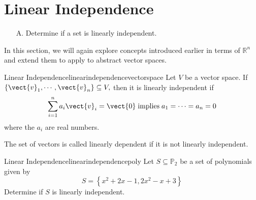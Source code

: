 \section{Linear Independence}

\begin{outcome}
\begin{enumerate}
\item[A.] Determine if a set is linearly independent.
\end{enumerate}
\end{outcome}

In this section, we will again explore concepts introduced earlier in terms of $\mathbb{R}^n$ and extend them to apply to abstract vector spaces. 

\begin{definition}{Linear Independence}{linearindependencevectorspace}
Let $V$ be a vector space. If $\{\vect{v}_{1},\cdots ,\vect{v}_{n}\} \subseteq V,$ then it is linearly independent
 if
\begin{equation*}
\sum_{i=1}^{n}a_{i}\vect{v}_{i}=\vect{0} \;\mbox{implies}\;
a_{1}=\cdots =a_{n}=0
\end{equation*}
where the $a_i$ are real numbers. 
\end{definition}

The
set of vectors is called linearly dependent if it is not linearly independent.

\begin{example}{Linear Independence}{linearindependencepoly}
Let $S \subseteq \mathbb{P}_2$ be a set of polynomials given by
\[
S = \left\{ x^2 + 2x - 1, 2x^2 - x + 3 \right\}
\]
Determine if $S$ is linearly independent. 
\end{example}

